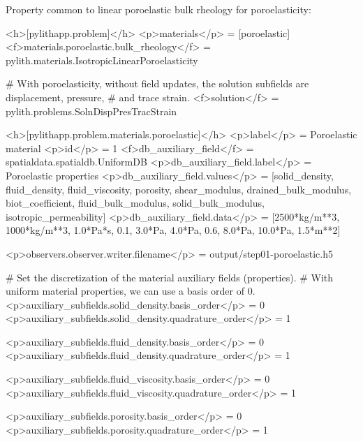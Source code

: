 Property common to linear poroelastic bulk rheology for poroelasticity:
\begin{inventory}
\end{inventory}

\begin{cfg}
  <h>[pylithapp.problem]</h>
  <p>materials</p> = [poroelastic]
  <f>materials.poroelastic.bulk_rheology</f> = pylith.materials.IsotropicLinearPoroelasticity

  # With poroelasticity, without field updates, the solution subfields are displacement, pressure,
  # and trace strain.
  <f>solution</f> = pylith.problems.SolnDispPresTracStrain

    <h>[pylithapp.problem.materials.poroelastic]</h>
  <p>label</p> = Poroelastic material
  <p>id</p> = 1
  <f>db_auxiliary_field</f> = spatialdata.spatialdb.UniformDB
  <p>db_auxiliary_field.label</p> = Poroelastic properties
  <p>db_auxiliary_field.values</p> = [solid_density, fluid_density, fluid_viscosity, porosity, shear_modulus,
  drained_bulk_modulus, biot_coefficient, fluid_bulk_modulus, solid_bulk_modulus, isotropic_permeability]
  <p>db_auxiliary_field.data</p> = [2500*kg/m**3, 1000*kg/m**3, 1.0*Pa*s, 0.1, 3.0*Pa, 4.0*Pa, 0.6,
  8.0*Pa, 10.0*Pa, 1.5*m**2]

  <p>observers.observer.writer.filename</p> = output/step01-poroelastic.h5

  # Set the discretization of the material auxiliary fields (properties).
  # With uniform material properties, we can use a basis order of 0.
  <p>auxiliary_subfields.solid_density.basis_order</p> = 0
  <p>auxiliary_subfields.solid_density.quadrature_order</p> = 1

  <p>auxiliary_subfields.fluid_density.basis_order</p> = 0
  <p>auxiliary_subfields.fluid_density.quadrature_order</p> = 1

  <p>auxiliary_subfields.fluid_viscosity.basis_order</p> = 0
  <p>auxiliary_subfields.fluid_viscosity.quadrature_order</p> = 1

  <p>auxiliary_subfields.porosity.basis_order</p> = 0
  <p>auxiliary_subfields.porosity.quadrature_order</p> = 1


\end{cfg}

